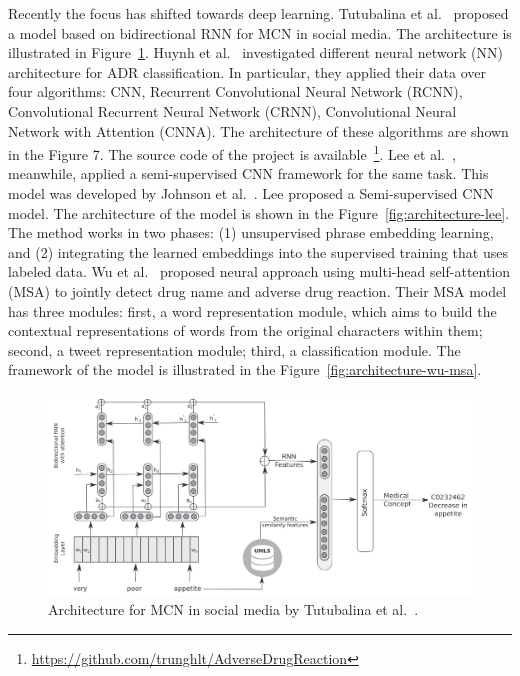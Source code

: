 Recently the focus has shifted towards deep learning. Tutubalina et al.~\cite{TUTUBALINA201893} proposed a model based on bidirectional RNN for MCN in social media. The architecture is illustrated in Figure~\ref{fig:architecture-tutubalina}. Huynh et al.~\cite{huynh2016adverse} investigated different neural network (NN) architecture for ADR classification. In particular, they applied their data over four algorithms: CNN, Recurrent Convolutional Neural Network (RCNN), Convolutional Recurrent Neural Network (CRNN), Convolutional Neural Network with Attention (CNNA). The architecture of these algorithms are shown in the Figure 7. The source code of the project is available~\footnote{\url{https://github.com/trunghlt/AdverseDrugReaction}}. Lee et al.~\cite{lee2017adverse}, meanwhile, applied a semi-supervised CNN framework for the same task. This model was developed by Johnson et al.~\cite{johnson2015semi}. Lee proposed a Semi-supervised CNN model. The architecture of the model is shown in the Figure~\ref{fig:architecture-lee}. The method works in two phases: (1) unsupervised phrase embedding learning, and (2) integrating the learned embeddings into the supervised training that uses labeled data. Wu et al.~\cite{wu2018detecting, wu2019msa} proposed neural approach using multi-head self-attention (MSA) to jointly detect drug name and adverse drug reaction. Their MSA model has three modules: first, a word representation module, which aims to build the contextual representations of words from the original characters within them; second, a tweet representation module; third, a classification module. The framework of the model is illustrated in the Figure~\ref{fig:architecture-wu-msa}.

\begin{figure}[h]
	\centering
	\includegraphics[width=0.99\linewidth]{Figures/f.png}
	\caption{Architecture for MCN in social media by Tutubalina et al.~\cite{TUTUBALINA201893}.}
	\label{fig:architecture-tutubalina}
\end{figure}

